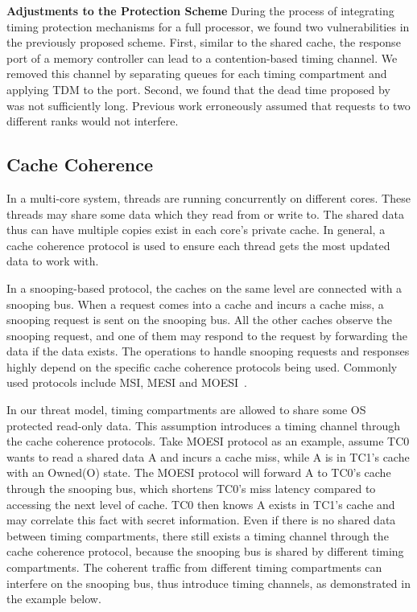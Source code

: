 \textbf{Adjustments to the Protection Scheme}
During the process of integrating timing protection mechanisms for a full
processor, we found two vulnerabilities in the previously proposed scheme.
First, similar to the shared cache, the response port of a memory controller
can lead to a contention-based timing channel. We removed this channel by
separating queues for each timing compartment and applying TDM to the port.
Second, we found that the dead time proposed by ~\cite{ushpca14} was not 
sufficiently long. Previous work erroneously assumed that requests to two
different ranks would not interfere.

\subsection{Cache Coherence}
In a multi-core system, threads are running concurrently on different cores. 
These threads may share some
data which they read from or write to. The shared data thus can have multiple 
copies exist in each core's
private cache. In general, a cache coherence protocol is used to ensure each 
thread gets the most updated
data to work with.

In a snooping-based protocol, the caches on the same level are connected with a 
snooping bus. When a request
comes into a cache and incurs a cache miss, a snooping request is sent on the 
snooping bus. All the other
caches observe the snooping request, and one of them may respond to the request 
by forwarding the data if the data exists. The operations to handle snooping 
requests and responses highly depend on the specific cache coherence protocols 
being used. Commonly used protocols include MSI, MESI and 
MOESI~\cite{mark_book}.

In our threat model, timing compartments are allowed to share some OS protected 
read-only data. This assumption
introduces a timing channel through the cache coherence protocols. Take MOESI 
protocol as an example, assume TC0 wants
to read a shared data A and incurs a cache miss, while A is in TC1's cache with 
an Owned(O) state. The MOESI protocol
will forward A to TC0's cache through the snooping bus, which shortens TC0's 
miss latency compared to accessing the
next level of cache. TC0 then knows A exists in TC1's cache and may correlate 
this fact with secret information.  Even if there is no shared data between 
timing compartments, there still exists a timing channel through the cache
coherence protocol, because the snooping bus is shared by different timing 
compartments.  The coherent traffic from different timing compartments can 
interfere on the snooping bus, thus introduce timing
channels, as demonstrated in the example below.

